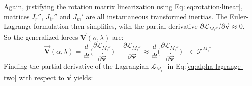 Again, justifying the rotation matrix linearization using Eq:\ref{eq:rotation-linear}, matrices $J_r''$, $J_{ir}''$ and $J_m'$ are all instantaneous transformed inertias. The Euler-Lagrange formulation then simplifies, with the partial derivative $\partial\mathcal{L}_{M_i''}/\partial\vec{\mathbf{v}}\approx 0$. So the generalized forces $\vec{\mathbf{V}}(\alpha,\lambda)$ are:
\begin{equation}
\vec{\mathbf{V}}(\alpha,\lambda)=\frac{d}{dt}\Bigg(\frac{\partial\mathcal{L}_{M_i''}}{\partial\dot{\vec{\mathbf{v}}}}\Bigg)-\frac{\partial\mathcal{L}_{M_i''}}{\partial\vec{\mathbf{v}}}\approx\frac{d}{dt}\Bigg(\frac{\partial\mathcal{L}_{M_i''}}{\partial\dot{\vec{\mathbf{v}}}}\Bigg)~~~~\in\mathcal{F}^{M_i''}
\end{equation}
Finding the partial derivative of the Lagrangian $\mathcal{L}_{M_i''}$ in Eq:\ref{eq:alpha-lagrange-two} with respect to $\dot{\vec{\mathbf{v}}}$ yields:
